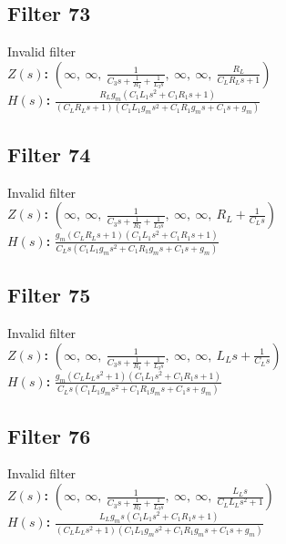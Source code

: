 \documentclass{article}
\begin{document}
\subsection*{Filter 73}
Invalid filter \\ 
\textbf{$Z(s)$:} $\left( \infty, \  \infty, \  \frac{1}{C_{3} s + \frac{1}{R_{3}} + \frac{1}{L_{3} s}}, \  \infty, \  \infty, \  \frac{R_{L}}{C_{L} R_{L} s + 1}\right)$ \\ 
\textbf{$H(s)$:} $\frac{R_{L} g_{m} \left(C_{1} L_{1} s^{2} + C_{1} R_{1} s + 1\right)}{\left(C_{L} R_{L} s + 1\right) \left(C_{1} L_{1} g_{m} s^{2} + C_{1} R_{1} g_{m} s + C_{1} s + g_{m}\right)}$ \\ 
\subsection*{Filter 74}
Invalid filter \\ 
\textbf{$Z(s)$:} $\left( \infty, \  \infty, \  \frac{1}{C_{3} s + \frac{1}{R_{3}} + \frac{1}{L_{3} s}}, \  \infty, \  \infty, \  R_{L} + \frac{1}{C_{L} s}\right)$ \\ 
\textbf{$H(s)$:} $\frac{g_{m} \left(C_{L} R_{L} s + 1\right) \left(C_{1} L_{1} s^{2} + C_{1} R_{1} s + 1\right)}{C_{L} s \left(C_{1} L_{1} g_{m} s^{2} + C_{1} R_{1} g_{m} s + C_{1} s + g_{m}\right)}$ \\ 
\subsection*{Filter 75}
Invalid filter \\ 
\textbf{$Z(s)$:} $\left( \infty, \  \infty, \  \frac{1}{C_{3} s + \frac{1}{R_{3}} + \frac{1}{L_{3} s}}, \  \infty, \  \infty, \  L_{L} s + \frac{1}{C_{L} s}\right)$ \\ 
\textbf{$H(s)$:} $\frac{g_{m} \left(C_{L} L_{L} s^{2} + 1\right) \left(C_{1} L_{1} s^{2} + C_{1} R_{1} s + 1\right)}{C_{L} s \left(C_{1} L_{1} g_{m} s^{2} + C_{1} R_{1} g_{m} s + C_{1} s + g_{m}\right)}$ \\ 
\subsection*{Filter 76}
Invalid filter \\ 
\textbf{$Z(s)$:} $\left( \infty, \  \infty, \  \frac{1}{C_{3} s + \frac{1}{R_{3}} + \frac{1}{L_{3} s}}, \  \infty, \  \infty, \  \frac{L_{L} s}{C_{L} L_{L} s^{2} + 1}\right)$ \\ 
\textbf{$H(s)$:} $\frac{L_{L} g_{m} s \left(C_{1} L_{1} s^{2} + C_{1} R_{1} s + 1\right)}{\left(C_{L} L_{L} s^{2} + 1\right) \left(C_{1} L_{1} g_{m} s^{2} + C_{1} R_{1} g_{m} s + C_{1} s + g_{m}\right)}$ \\ 
\end{document}
